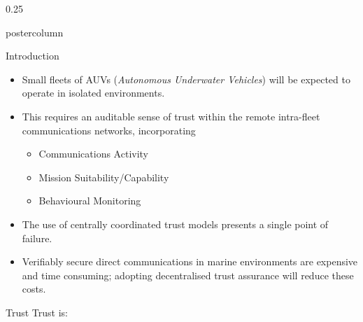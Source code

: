 \documentclass[final,hyperref={pdfpagelabels=false}]{beamer}
\def\colwidth{0.25\linewidth}
\begin{document}
\begin{frame}[fragile]
\begin{columns}[t]
\begin{column}{\colwidth}
\begin{beamercolorbox}[center,wd=\textwidth]{postercolumn}
\begin{minipage}[T]{.98\textwidth}
{\begin{block}{Introduction}
              \vspace{\lineskip}
              \begin{itemize}
                \item Small fleets of AUVs (\emph{Autonomous Underwater Vehicles}) will be expected to operate in isolated environments.
                \item This requires an auditable sense of trust within the remote intra-fleet communications networks, incorporating
                  \begin{itemize}
                    \item Communications Activity
                    \item Mission Suitability/Capability
                    \item Behavioural Monitoring
                  \end{itemize}
                \item The use of centrally coordinated trust models presents a single point of failure.
                \item Verifiably secure direct communications in marine environments are expensive and time consuming; adopting decentralised trust assurance will reduce these costs.\cite{Partan2006}
              \end{itemize}
            \end{block}

              \begin{block}{Trust}
                  Trust is:
                  \begin{itemize}

\end{itemize}
\end{block}}
\end{minipage}
\end{beamercolorbox}
\end{column}
\end{columns}
\end{frame}
\end{document}
